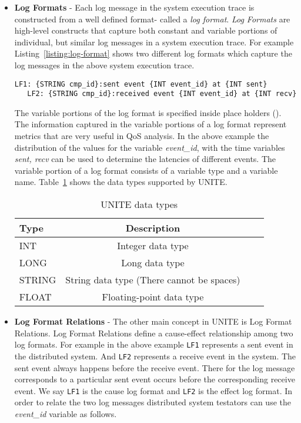 \begin{itemize}
  \item \textbf{Log Formats} - Each log message in the system execution 
  trace is constructed from a well defined format- called a \textit{log format}.
  \textit{Log Formats} are high-level constructs that capture both constant 
  and variable portions of individual, but similar log messages in a system 
  execution trace. For example Listing~\ref{listing:log-format}  shows 
  two different log formats which capture the log messages in 
  the above system execution trace.
  
  \begin{lstlisting}[label=listing:log-format, caption=Log formats for QoS analysis.,
   captionpos=b]
   LF1: {STRING cmp_id}:sent event {INT event_id} at {INT sent}
   LF2: {STRING cmp_id}:received event {INT event_id} at {INT recv}
  \end{lstlisting}
  
  The variable portions of the log format is specified inside place holders ({}).
  The information captured in the variable portions of a log format represent 
  metrics that  are very useful in QoS analysis. In the above example the 
  distribution of the values for the variable \textit{event\_id}, with the time 
  variables \textit{sent, recv } can be used to determine the latencies of 
  different events. The variable portion of a log format consists of a variable 
  type and a variable name. Table~\ref{table:data-types} shows the data types 
  supported by UNITE.
  
 \begin{table}[h, captionpos=b]
  \centering
  \caption{UNITE data types}
  \label{table:data-types}
  \begin{tabular}{lccl}
  \hline
  \textbf{Type} & \textbf{Description} \\
  \hline
  INT & Integer data type \\
  LONG & Long data type \\
  STRING & String data type (There cannot be spaces) \\
  FLOAT & Floating-point data type \\
  \hline
  \end{tabular}
\end{table}
  
  \item \textbf{Log Format Relations} - The other main concept in UNITE 
  is Log Format Relations. Log Format Relations define a cause-effect 
  relationship among two log formats. For example in the above example
  \texttt{LF1} represents a sent event in the distributed system. And \texttt{LF2} 
  represents a receive event in the system. The sent event always 
  happens before the receive event. There for the log message corresponds 
  to a particular sent event occurs before the corresponding receive event.
  We say \texttt{LF1} is the cause log format and \texttt{LF2} is the effect log format. In 
  order to relate the two log messages distributed system testators can use 
  the \textit{event\_id} variable as follows.
  

\end{itemize}
